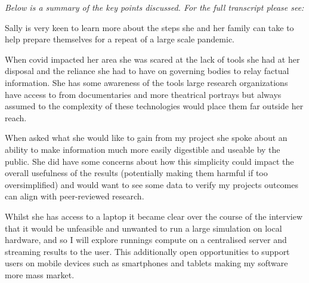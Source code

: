 \textit{Below is a summary of the key points discussed. For the full transcript please see: }

Sally is very keen to learn more about the steps she and her family can take to help prepare themselves for a repeat of a large scale pandemic. 

When covid impacted her area she was scared at the lack of tools she had at her disposal and the reliance she had to have on governing bodies to relay factual information. She has some awareness of the tools large research organizations have access to from documentaries and more theatrical portrays but always assumed to the complexity of these technologies would place them far outside her reach.

When asked what she would like to gain from my project she spoke about an ability to make information much more easily digestible and useable by the public. She did have some concerns about how this simplicity could impact the overall usefulness of the results (potentially making them harmful if too oversimplified) and would want to see some data to verify my projects outcomes can align with peer-reviewed research.

Whilst she has access to a laptop it became clear over the course of the interview that it would be unfeasible and unwanted to run a large simulation on local hardware, and so I will explore runnings compute on a centralised server and streaming results to the user. This additionally open opportunities to support users on mobile devices such as smartphones and tablets making my software more mass market.

